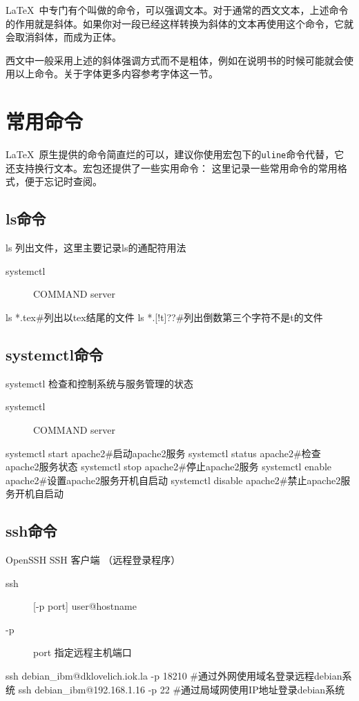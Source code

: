 \LaTeX\ 中专门有个叫做的命令，可以强调文本。对于通常的西文文本，上述命令的作用就是斜体。如果你对一段已经这样转换为斜体的文本再使用这个命令，它就会取消斜体，而成为正体。

西文中一般采用上述的斜体强调方式而不是粗体，例如在说明书的时候可能就会使用以上命令。关于字体更多内容参考字体这一节。

\section{常用命令}
\LaTeX\ 原生提供的命令简直烂的可以，建议你使用宏包下的\texttt{uline}命令代替，它还支持换行文本。宏包还提供了一些实用命令：
这里记录一些常用命令的常用格式，便于忘记时查阅。
\subsection{ls命令}
	ls 列出文件，这里主要记录ls的通配符用法
	\begin{description}
		\item[systemctl] COMMAND server
	\end{description}
\begin{shell}
ls *.tex#列出以tex结尾的文件
ls *.[!t]??#列出倒数第三个字符不是t的文件
\end{shell}
\subsection{systemctl命令}
	systemctl 检查和控制系统与服务管理的状态
	\begin{description}
		\item[systemctl] COMMAND server
	\end{description}
\begin{shell}
systemctl start apache2#启动apache2服务
systemctl status apache2#检查apache2服务状态
systemctl stop apache2#停止apache2服务
systemctl enable apache2#设置apache2服务开机自启动
systemctl disable apache2#禁止apache2服务开机自启动
\end{shell}
\subsection{ssh命令}
	OpenSSH SSH 客户端 （远程登录程序）
	\begin{description}
		\item[ssh] [-p port] user@hostname
		\item[-p] port 指定远程主机端口
	\end{description}
\begin{shell}
ssh debian_ibm@dklovelich.iok.la -p 18210 #通过外网使用域名登录远程debian系统
ssh debian_ibm@192.168.1.16 -p 22 #通过局域网使用IP地址登录debian系统
\end{shell}

